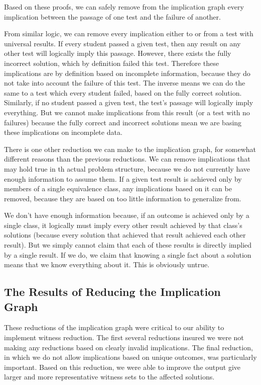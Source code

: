 \documentclass[11pt]{article}
\begin{document}
Based on these proofs, we can safely remove from the implication graph every implication between the passage of one test and the failure of another.

From similar logic, we can remove every implication either to or from a test with universal results. If every student passed a given test, then any result on any other test will logically imply this passage. However, there exists the fully incorrect solution, which by definition failed this test. Therefore these implications are by definition based on incomplete information, because they do not take into account the failure of this test. The inverse means we can do the same to a test which every student failed, based on the fully correct solution. Similarly, if no student passed a given test, the  test's passage will logically imply everything. But we cannot make implications  from this result (or a test with no failures) because the fully correct and incorrect solutions mean we are basing these implications on incomplete data.

There is one other reduction we can make to the implication graph, for somewhat different reasons than the previous reductions. We can remove implications that may hold true in th actual problem structure, because we do not currently have enough information to assume them. If a given test result is achieved only by members of a single equivalence class, any implications based on it can be removed, because they are based on too little information to generalize from.

We don't have enough information because, if an outcome is achieved only by a single class, it logically must imply every other result achieved by that class's solutions (because every solution that achieved that result achieved each other result). But we simply cannot claim that each of these results is directly implied by a single result. If we do, we claim that knowing a single fact about a solution means that we know everything about it. This is obviously untrue.

\subsection{The Results  of Reducing the Implication Graph}

These reductions of the implication graph were critical to our ability to implement witness reduction. The first several reductions insured we were not making any reductions based on clearly invalid implications. The final reduction, in which we do not allow implications based on unique outcomes, was particularly important. Based on this reduction, we were able to improve the output give larger and more representative witness sets to the affected solutions.
\end{document}
